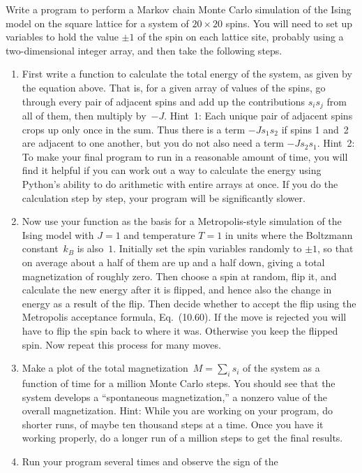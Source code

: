 \documentclass[12pt]{article}
\begin{document}
\begin{exercises}
Write a program to perform a Markov chain Monte Carlo simulation of
the Ising model on the square lattice for a system of $20\times20$ spins.
You will need to set up variables to hold the value $\pm1$ of the spin on
each lattice site, probably using a two-dimensional integer array, and then
take the following steps.
\begin{enumerate}\setlength{\itemsep}{0pt}
\item First write a function to calculate the total energy of the system,
  as given by the equation above.  That is, for a given array of values of
  the spins, go through every pair of adjacent spins and add up the
  contributions $s_is_j$ from all of them, then multiply by~$-J$.  Hint~1:
  Each unique pair of adjacent spins crops up only once in the sum.  Thus
  there is a term $-Js_1 s_2$ if spins 1 and~2 are adjacent to one another,
  but you do not also need a term $-Js_2 s_1$.  Hint~2: To make your final
  program to run in a reasonable amount of time, you will find it helpful
  if you can work out a way to calculate the energy using Python's ability
  to do arithmetic with entire arrays at once.  If you do the calculation
  step by step, your program will be significantly slower.
\item Now use your function as the basis for a Metropolis-style simulation
  of the Ising model with $J=1$ and temperature $T=1$ in units where the
  Boltzmann constant~$k_B$ is also~$1$.  Initially set the spin variables
  randomly to $\pm1$, so that on average about a half of them are up and a
  half down, giving a total magnetization of roughly zero.  Then choose a
  spin at random, flip it, and calculate the new energy after it is
  flipped, and hence also the change in energy as a result of the flip.
  Then decide whether to accept the flip using the Metropolis acceptance
  formula, Eq.~(10.60).  If the move is rejected you will have to flip the
  spin back to where it was.  Otherwise you keep the flipped spin.  Now
  repeat this process for many moves.
\item Make a plot of the total magnetization~$M=\sum_i s_i$ of the system
  as a function of time for a million Monte Carlo steps.  You should see
  that the system develops a ``spontaneous magnetization,'' a nonzero value
  of the overall magnetization.  Hint: While you are working on your
  program, do shorter runs, of maybe ten thousand steps at a time.  Once
  you have it working properly, do a longer run of a million steps to get
  the final results.
\item Run your program several times and observe the sign of the

\end{enumerate}
\end{exercises}
\end{document}
